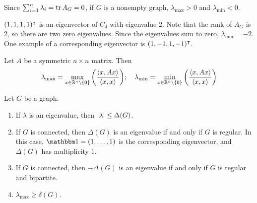 Since \( \sum_{i=1}^n \lambda_i = \tr A_G = 0 \), if \( G \) is a nonempty graph, \( \lambda_{\mathrm{max}} > 0 \) and \( \lambda_{\mathrm{min}} < 0 \).
\begin{example}
	\( (1, 1, 1, 1)^\intercal \) is an eigenvector of \( C_4 \) with eigenvalue 2.
	Note that the rank of \( A_G \) is 2, so there are two zero eigenvalues.
	Since the eigenvalues sum to zero, \( \lambda_{\mathrm{min}} = -2 \).
	One example of a corresponding eigenvector is \( (1, -1, 1, -1)^\intercal \).
\end{example}
\begin{proposition}
	Let \( A \) be a symmetric \( n \times n \) matrix.
	Then
	\[ \lambda_{\mathrm{max}} = \max_{x \in \mathbb R^n \setminus \qty{0}}\qty( \frac{\left\langle{x, Ax}\right\rangle}{\left\langle{x, x}\right\rangle} ); \quad \lambda_{\mathrm{min}} = \min_{x \in \mathbb R^n \setminus \qty{0}}\qty( \frac{\left\langle{x, Ax}\right\rangle}{\left\langle{x, x}\right\rangle} ) \]
\end{proposition}
\begin{proposition}
	Let \( G \) be a graph.
	\begin{enumerate}
		\item If \( \lambda \) is an eigenvalue, then \( \abs{\lambda} \leq \Delta(G) \).
		\item If \( G \) is connected, then \( \Delta(G) \) is an eigenvalue if and only if \( G \) is regular.
			In this case, \( \mathbbm 1 = (1, \dots, 1) \) is the corresponding eigenvector, and \( \Delta(G) \) has multiplicity 1.
		\item If \( G \) is connected, then \( -\Delta(G) \) is an eigenvalue if and only if \( G \) is regular and bipartite.
		\item \( \lambda_{\mathrm{max}} \geq \delta(G) \).
	\end{enumerate}
\end{proposition}
